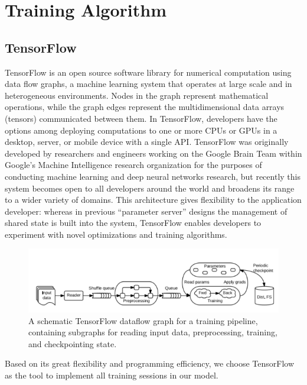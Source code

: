 \documentclass[12pt]{report} %
\begin{document}
\section{Training Algorithm}
\subsection{TensorFlow}
TensorFlow\cite{TF,TF2} is an open source software library for numerical computation using data flow graphs, a machine learning system that operates at large scale and in heterogeneous environments. Nodes in the graph represent mathematical operations, while the graph edges represent the multidimensional data arrays (tensors) communicated between them. In TensorFlow, developers have the options among deploying computations to one or more CPUs or GPUs in a desktop, server, or mobile device with a single API. TensorFlow was originally developed by researchers and engineers working on the Google Brain Team within Google's Machine Intelligence research organization for the purposes of conducting machine learning and deep neural networks research, but recently this system becomes open to all developers around the world and broadens its range to a wider variety of domains. This architecture gives flexibility to the application developer: whereas in previous “parameter server” designs the management of shared state is built into the system, TensorFlow enables developers to experiment with novel optimizations and training algorithms. \\
\begin{figure}[H]
	\centering
	\includegraphics[scale=1.0]{pictures/tensorflow.png}
	\caption{A schematic TensorFlow dataflow graph for a training pipeline, containing subgraphs for reading input data, preprocessing, training, and checkpointing state\cite{TFPIC}.}
	\label{fig:3}
\end{figure}
Based on its great flexibility and programming efficiency, we choose TensorFlow as the tool to implement all training sessions in our model. 
\end{document}
